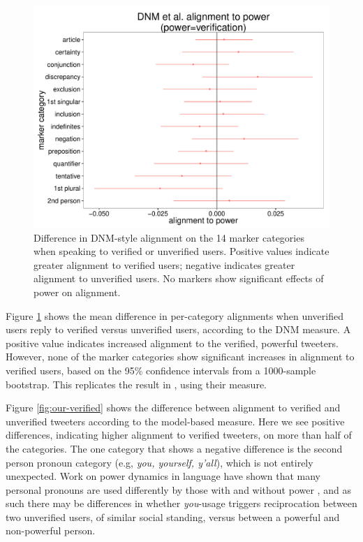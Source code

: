 \documentclass{acm_proc_article-sp}
\begin{document}
\begin{figure}[t]
\centering
\includegraphics[width=.9\columnwidth]{graphics/www2016_dnmpowerdiff_verif.pdf}
\caption{Difference in DNM-style alignment on the 14 marker categories when speaking to verified or unverified users. Positive values indicate greater alignment to verified users; negative indicates greater alignment to unverified users. No markers show significant effects of power on alignment.}\label{fig:dnm-verified}
\end{figure}

Figure \ref{fig:dnm-verified} shows the mean difference in per-category alignments when unverified users reply to verified versus unverified users, according to the DNM measure.  A positive value indicates increased alignment to the verified, powerful tweeters.  However, none of the marker categories show significant increases in alignment to verified users, based on the 95\% confidence intervals from a 1000-sample bootstrap.  This replicates the result in \cite{DNMGamonDumais2011}, using their measure.

Figure \ref{fig:our-verified} shows the difference between alignment to verified and unverified tweeters according to the model-based measure. Here we see positive differences, indicating higher alignment to verified tweeters, on more than half of the categories.  The one category that shows a negative difference is the second person pronoun category (e.g, \textit{you, yourself, y'all}), which is not entirely unexpected. Work on power dynamics in language have shown that many personal pronouns are used differently by those with and without power \cite{KacewiczEtAl2013,ChungPennebaker2007}, and as such there may be differences in whether \textit{you}-usage triggers reciprocation between two unverified users, of similar social standing, versus between a powerful and non-powerful person.
\end{document}
